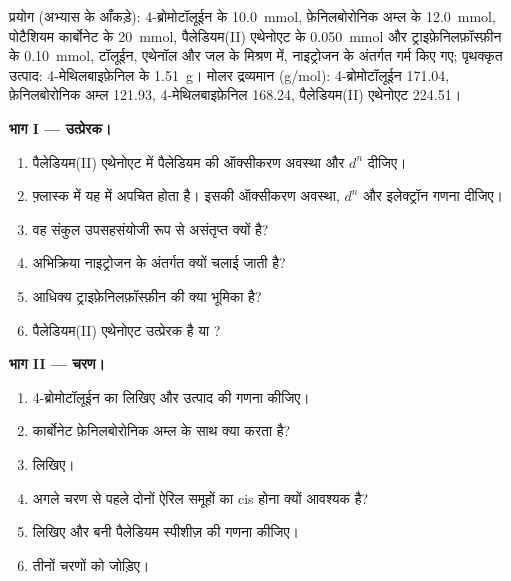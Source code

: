 \begin{problem}
\label{pb:b2:catalytic-cycles:1}
प्रयोग (अभ्यास के आँकड़े): 4-ब्रोमोटॉलूईन के \qty{10.0}{mmol},
फ़ेनिलबोरोनिक अम्ल के \qty{12.0}{mmol}, पोटैशियम कार्बोनेट के \qty{20}{mmol}, पैलेडियम(II)
एथेनोएट के \qty{0.050}{mmol} और ट्राइफ़ेनिलफ़ॉस्फ़ीन के \qty{0.10}{mmol}, टॉलूईन, एथेनॉल और
जल के मिश्रण में, नाइट्रोजन के अंतर्गत गर्म किए गए; पृथक्कृत उत्पाद: 4-मेथिलबाइफ़ेनिल के \qty{1.51}{g}। मोलर
द्रव्यमान (\unit{g/mol}): 4-ब्रोमोटॉलूईन 171.04, फ़ेनिलबोरोनिक अम्ल 121.93, 4-मेथिलबाइफ़ेनिल
168.24, पैलेडियम(II) एथेनोएट 224.51।

\medskip
\noindent\textbf{भाग I --- उत्प्रेरक।}
\begin{enumerate}
  \item पैलेडियम(II) एथेनोएट में पैलेडियम की ऑक्सीकरण अवस्था और $d^n$ दीजिए।
  \item फ़्लास्क में यह  में अपचित होता है। इसकी ऑक्सीकरण अवस्था, $d^n$ और
        इलेक्ट्रॉन गणना दीजिए।
  \item वह संकुल उपसहसंयोजी रूप से असंतृप्त क्यों है?
  \item अभिक्रिया नाइट्रोजन के अंतर्गत क्यों चलाई जाती है?
  \item आधिक्य ट्राइफ़ेनिलफ़ॉस्फ़ीन की क्या भूमिका है?
  \item पैलेडियम(II) एथेनोएट उत्प्रेरक है या ?
\end{enumerate}

\medskip
\noindent\textbf{भाग II --- चरण।}
\begin{enumerate}[resume]
  \item 4-ब्रोमोटॉलूईन का  लिखिए और उत्पाद की गणना कीजिए।
  \item कार्बोनेट फ़ेनिलबोरोनिक अम्ल के साथ क्या करता है?
  \item {} लिखिए।
  \item अगले चरण से पहले दोनों ऐरिल समूहों का cis होना क्यों आवश्यक है?
  \item {} लिखिए और बनी पैलेडियम स्पीशीज़ की गणना कीजिए।
  \item तीनों चरणों को जोड़िए।
\end{enumerate}


\end{problem}
